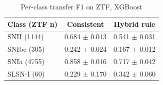 \begin{table}
\centering
\caption{Per-class transfer F1 on ZTF, XGBoost}
\begin{tabular}{lcc}
\hline
Class (ZTF n) & Consistent & Hybrid rule \\
\hline
SNII (1144) & 0.684 $\pm$ 0.013 & 0.541 $\pm$ 0.031 \\
SNIbc (305) & 0.242 $\pm$ 0.024 & 0.167 $\pm$ 0.012 \\
SNIa (4755) & 0.858 $\pm$ 0.016 & 0.717 $\pm$ 0.042 \\
SLSN-I (60) & 0.229 $\pm$ 0.170 & 0.342 $\pm$ 0.060 \\
\hline
\end{tabular}
\end{table}
